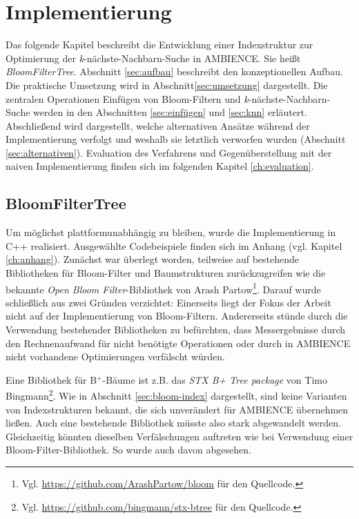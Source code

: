 \chapter{Implementierung}\label{ch:implementierung}
Das folgende Kapitel beschreibt die Entwicklung einer Indexstruktur zur Optimierung der \textit{k}-nächste-Nachbarn-Suche in AMBIENCE. Sie heißt \textit{BloomFilterTree}. Abschnitt \ref{sec:aufbau} beschreibt den konzeptionellen Aufbau. Die praktische Umsetzung wird in Abschnitt\ref{sec:umsetzung} dargestellt. Die zentralen Operationen Einfügen von Bloom-Filtern und \textit{k}-nächste-Nachbarn-Suche werden in den Abschnitten \ref{sec:einfügen} und \ref{sec:knn} erläutert. Abschließend wird dargestellt, welche alternativen Ansätze während der Implementierung verfolgt und weshalb sie letztlich verworfen wurden (Abschnitt \ref{sec:alternativen}). Evaluation des Verfahrens und Gegenüberstellung mit der naiven Implementierung finden sich im folgenden Kapitel \ref{ch:evaluation}.  
\section{BloomFilterTree}\label{sec:bloom-filter-tree}
Um möglichst plattformunabhängig zu bleiben, wurde die Implementierung in C++ realisiert. Ausgewählte Codebeispiele finden sich im Anhang (vgl. Kapitel \ref{ch:anhang}). Zunächst war überlegt worden, teilweise auf bestehende Bibliotheken für Bloom-Filter und Baumstrukturen zurückzugreifen wie die bekannte \textit{Open Bloom Filter}-Bibliothek von Arash Partow\footnote{Vgl. \url{https://github.com/ArashPartow/bloom} für den Quellcode.}. Darauf wurde schließlich aus zwei Gründen verzichtet: Einerseits liegt der Fokus der Arbeit nicht auf der Implementierung von Bloom-Filtern. Andererseits stünde durch die Verwendung bestehender Bibliotheken zu befürchten, dass Messergebnisse durch den Rechnenaufwand für nicht benötigte Operationen oder durch in AMBIENCE nicht vorhandene Optimierungen verfälscht würden. 

Eine Bibliothek für B$^+$-Bäume ist z.B. das \textit{STX B+ Tree package} von Timo Bingmann\footnote{Vgl. \url{https://github.com/bingmann/stx-btree} für den Quellcode.}. Wie in Abschnitt \ref{sec:bloom-index} dargestellt, sind keine Varianten von Indexstrukturen bekannt, die sich unverändert für AMBIENCE übernehmen ließen. Auch eine bestehende Bibliothek müsste also stark abgewandelt werden. Gleichzeitig könnten dieselben Verfälschungen auftreten wie bei Verwendung einer Bloom-Filter-Bibliothek. So wurde auch davon abgesehen.

